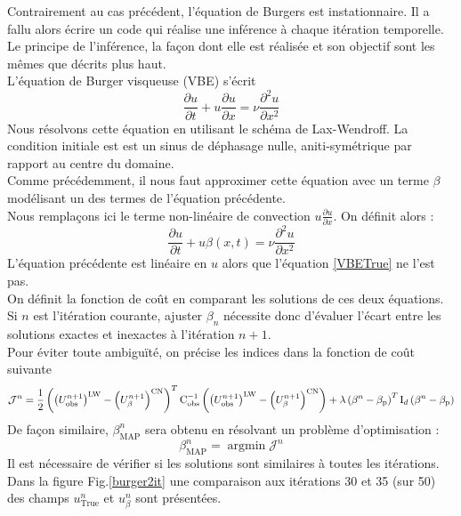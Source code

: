 \documentclass[a4paper,12pt]{article}
\newcommand{\argmin}{\mathop{\mathrm{argmin}}}
\newcommand{\bepar}[1]{
	\left( #1 \right)  
}
\newcommand{\bmap}{\beta_{\text{MAP}}}
\numberwithin{equation}{section} %
\begin{document}
\noindent Contrairement au cas précédent, l'équation de Burgers est instationnaire. Il a fallu alors écrire un code qui réalise une inférence à chaque itération temporelle. Le principe de l'inférence, la façon dont elle est réalisée et son objectif sont les mêmes que décrits plus haut.\\
\noindent L'équation de Burger visqueuse (VBE) s'écrit 
\begin{equation}
\frac{\partial u}{\partial t} + u \frac{\partial u}{\partial x} = \nu\frac{\partial^2 u}{\partial x^2}  \label{VBETrue} \tag{VBE}
\end{equation}
Nous résolvons cette équation en utilisant le schéma de Lax-Wendroff. La condition initiale est est un sinus de déphasage nulle, aniti-symétrique par rapport au centre du domaine.\\
Comme précédemment, il nous faut approximer cette équation avec un terme $\beta$ modélisant un des termes de l'équation précédente. \\
Nous remplaçons ici le terme non-linéaire de convection $\displaystyle u \frac{\partial u}{\partial x}$. On définit alors :
\begin{equation}
\frac{\partial u}{\partial t} + u \beta(x,t) = \nu \frac{\partial^2 u}{\partial x^2} \label{VBEbeta} \tag{VBE$\beta$}
\end{equation}
L'équation précédente est linéaire en $u$ alors que l'équation \eqref{VBETrue} ne l'est pas.\\
On définit la fonction de coût en comparant les solutions de ces deux équations. Si $n$ est l'itération courante, ajuster $\beta_n$ nécessite donc d'évaluer l'écart entre les solutions exactes et inexactes à l'itération $n+1$.\\
Pour éviter toute ambiguïté, on précise les indices dans la fonction de coût suivante 
\begin{equation}
\mathcal{J}^n = \frac{1}{2} \bepar{\bepar{U^{n+1}_{\text{obs}}}^\text{LW} - \bepar{U^{n+1}_\beta}^\text{CN}}^T \text{C}_\text{obs}^{-1} \bepar{\bepar{U^{n+1}_{\text{obs}}}^\text{LW} - \bepar{U^{n+1}_\beta}^\text{CN}} + \\ \lambda \bepar{\beta^n -
			\beta_{\text{p}}}^T \text{I}_d \bepar{\beta^n - \beta_\text{p}}
\end{equation}
De façon similaire, $\bmap^{n}$ sera obtenu en résolvant un problème d'optimisation :
\begin{equation}
\beta_{\text{MAP}}^n = \argmin \mathcal{J}^n
\end{equation}
Il est nécessaire de vérifier si les solutions sont similaires à toutes les itérations. Dans la figure Fig.\eqref{burger2it} une comparaison aux itérations 30 et 35 (sur 50) des champs $u^n_{\text{True}}$ et $u^n_{\beta}$ sont présentées. \\
\end{document}
